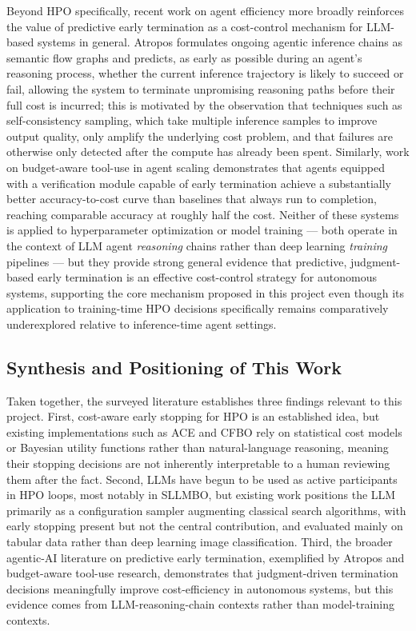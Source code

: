 \documentclass[11pt]{article}
\begin{document}
Beyond HPO specifically, recent work on agent efficiency more broadly reinforces the value of predictive early termination as a cost-control mechanism for LLM-based systems in general. Atropos formulates ongoing agentic inference chains as semantic flow graphs and predicts, as early as possible during an agent's reasoning process, whether the current inference trajectory is likely to succeed or fail, allowing the system to terminate unpromising reasoning paths before their full cost is incurred; this is motivated by the observation that techniques such as self-consistency sampling, which take multiple inference samples to improve output quality, only amplify the underlying cost problem, and that failures are otherwise only detected after the compute has already been spent. Similarly, work on budget-aware tool-use in agent scaling demonstrates that agents equipped with a verification module capable of early termination achieve a substantially better accuracy-to-cost curve than baselines that always run to completion, reaching comparable accuracy at roughly half the cost. Neither of these systems is applied to hyperparameter optimization or model training --- both operate in the context of LLM agent \emph{reasoning} chains rather than deep learning \emph{training} pipelines --- but they provide strong general evidence that predictive, judgment-based early termination is an effective cost-control strategy for autonomous systems, supporting the core mechanism proposed in this project even though its application to training-time HPO decisions specifically remains comparatively underexplored relative to inference-time agent settings.

\subsection{Synthesis and Positioning of This Work}

Taken together, the surveyed literature establishes three findings relevant to this project. First, cost-aware early stopping for HPO is an established idea, but existing implementations such as ACE and CFBO rely on statistical cost models or Bayesian utility functions rather than natural-language reasoning, meaning their stopping decisions are not inherently interpretable to a human reviewing them after the fact. Second, LLMs have begun to be used as active participants in HPO loops, most notably in SLLMBO, but existing work positions the LLM primarily as a configuration sampler augmenting classical search algorithms, with early stopping present but not the central contribution, and evaluated mainly on tabular data rather than deep learning image classification. Third, the broader agentic-AI literature on predictive early termination, exemplified by Atropos and budget-aware tool-use research, demonstrates that judgment-driven termination decisions meaningfully improve cost-efficiency in autonomous systems, but this evidence comes from LLM-reasoning-chain contexts rather than model-training contexts.
\end{document}
